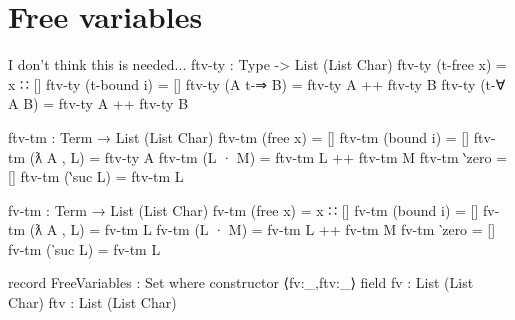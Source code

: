 \documentclass[logo,bsc,singlespacing,parskip,online]{infthesis}
\renewenvironment{code}{\mintedcopy[breaklines,breaksymbolleft=\;]{agda}}{\endmintedcopy}
\begin{document}
\begin{comment}
\begin{code}
  ax1-term i a b (free x) = refl
  ax1-term i a b (bound k) with i ≟ℕ k
  ... | yes refl = refl
  ... | no  i≢k  with i ≟ℕ k
  ... |   yes refl = contradiction refl i≢k
  ... |   no  _    = refl
  ax1-term i a b (ƛ A , L) rewrite ax1-term (suc i) a b L = refl
  ax1-term i a b (L · M)
    rewrite ax1-term i a b L | ax1-term i a b M = refl
  ax1-term i a b ‵zero = refl
  ax1-term i a b (‵suc L) rewrite ax1-term i a b L = refl

  ax5-term i j a b (free x) i≢j = refl
  ax5-term i j a b (bound k) i≢j with j ≟ℕ k
  ... | yes refl with i ≟ℕ j
  ... |   yes refl = contradiction refl i≢j
  ... |   no  i≢j with j ≟ℕ j
  ... |     yes refl = refl
  ... |     no  j≢j  = contradiction refl j≢j
  ax5-term i j a b (bound k) i≢j | no j≢k with i ≟ℕ k
  ... | yes refl = refl
  ... | no  i≢k with j ≟ℕ k
  ... |   yes refl = contradiction refl j≢k
  ... |   no  j≢k  = refl
  ax5-term i j a b (ƛ A , L) i≢j
    rewrite ax5-term (suc i) (suc j) a b L (suc-preserves-≢ i≢j)
      = refl
  ax5-term i j a b (L · M) i≢j
    rewrite ax5-term i j a b L i≢j | ax5-term i j a b M i≢j = refl
  ax5-term i j a b ‵zero i≢j = refl
  ax5-term i j a b (‵suc L) i≢j rewrite ax5-term i j a b L i≢j
    = refl
\end{code}
\end{comment}

\section{Free variables}
I don't think this is needed...
\begin{code}
  ftv-ty : Type -> List (List Char)
  ftv-ty (t-free x) = x ∷ []
  ftv-ty (t-bound i) = []
  ftv-ty (A t-⇒ B) = ftv-ty A ++ ftv-ty B
  ftv-ty (t-∀ A B) = ftv-ty A ++ ftv-ty B

  ftv-tm : Term → List (List Char)
  ftv-tm (free x) = []
  ftv-tm (bound i) = []
  ftv-tm (ƛ A , L) = ftv-ty A
  ftv-tm (L · M) = ftv-tm L ++ ftv-tm M
  ftv-tm ‵zero = []
  ftv-tm (‵suc L) = ftv-tm L

  fv-tm : Term → List (List Char)
  fv-tm (free x) = x ∷ []
  fv-tm (bound i) = []
  fv-tm (ƛ A , L) = fv-tm L
  fv-tm (L · M) = fv-tm L ++ fv-tm M
  fv-tm ‵zero = []
  fv-tm (‵suc L) = fv-tm L

  record FreeVariables : Set where
    constructor ⟨fv:_,ftv:_⟩
    field
      fv : List (List Char)
      ftv : List (List Char)
\end{code}
\end{document}
